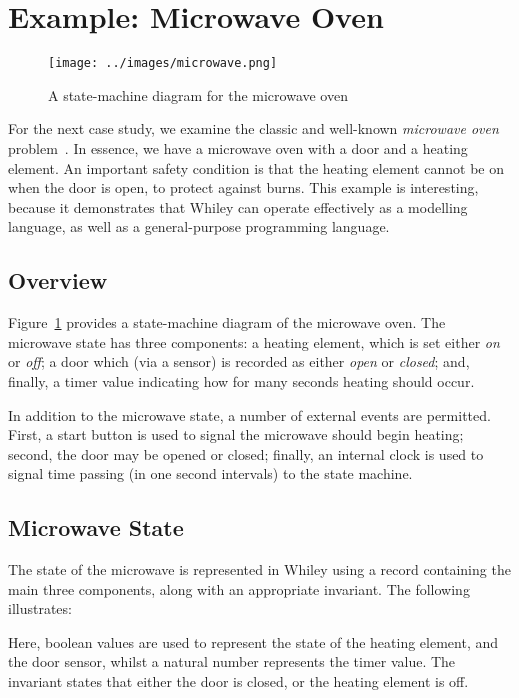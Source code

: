 \newpage
\section{Example: Microwave Oven}
\label{microwave}
\begin{figure}[!t]
\centering
\texttt{[image: ../images/microwave.png]}
\caption{A state-machine diagram for the microwave oven}
\label{fig_microwave}
\end{figure}

For the next case study, we examine the classic and well-known {\em
  microwave oven} problem~\cite{Heisel1996}.  In essence, we have a
microwave oven with a door and a heating element.  An important safety
condition is that the heating element cannot be on when the door is
open, to protect against burns.  This example is interesting, because
it demonstrates that Whiley can operate effectively as a modelling
language, as well as a general-purpose programming language.

\subsection{Overview}
Figure~\ref{fig_microwave} provides a state-machine diagram of the
microwave oven.  The microwave state has three components: a heating
element, which is set either {\em on} or {\em off}; a door which (via
a sensor) is recorded as either {\em open} or {\em closed}; and, finally, a timer value indicating how for many seconds heating should occur.

In addition to the microwave state, a number of external events are permitted.  First, a start button is used to signal the microwave should begin heating; second, the door may be opened or closed; finally, an internal clock is used to signal time passing (in one second intervals) to the state machine.

\subsection{Microwave State}
The state of the microwave is represented in Whiley using a record containing the main three components, along with an appropriate invariant.  The following illustrates:



Here, boolean values are used to represent the state of the heating element, and the door sensor, whilst a natural number represents the timer value.  The invariant states that either the door is closed, or the heating element is off.

